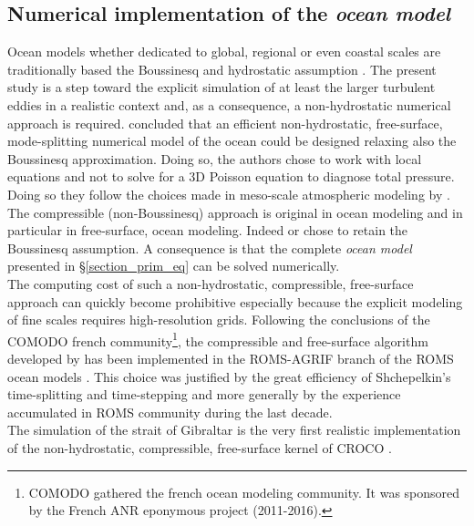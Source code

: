 \subsection{Numerical implementation of the \textit{ocean model}}
Ocean models whether dedicated to global, regional or even coastal scales are traditionally based the Boussinesq and hydrostatic assumption \citep{griffies_elements_2012,shchepetkin_regional_2005}. The present study is a step toward the explicit simulation of at least the larger turbulent eddies in a realistic context and, as a consequence, a non-hydrostatic numerical approach is required. \cite{auclair_non-hydrostatic_2018} concluded that an efficient non-hydrostatic, free-surface, mode-splitting numerical model of the ocean could be designed relaxing also the Boussinesq approximation. Doing so, the authors chose to work with local equations and not to solve for a 3D Poisson equation to diagnose total pressure. Doing so they follow the choices made in meso-scale atmospheric modeling by \cite{skamarock_prototypes_2001}. The compressible (non-Boussinesq) approach is original in ocean modeling and in particular in free-surface, ocean modeling. Indeed \cite{marshall_finite-volume_1997} or \cite{auclair_non-hydrostatic_2011} chose to retain the Boussinesq assumption. A consequence is that the complete \textit{ocean model} presented in \S\ref{section_prim_eq} can be solved numerically.\\
The computing cost of such a non-hydrostatic, compressible, free-surface approach can quickly become prohibitive especially because the explicit modeling of fine scales requires high-resolution grids. Following the conclusions of the COMODO french community\footnote{COMODO gathered the french ocean modeling community. It was sponsored by the French ANR eponymous project (2011-2016).}, the compressible and free-surface algorithm developed by \cite{auclair_non-hydrostatic_2018} has been implemented in the ROMS-AGRIF branch of the ROMS ocean models \citep{shchepetkin_regional_2005}. This choice was justified by the great efficiency of Shchepelkin's time-splitting and time-stepping and more generally by the experience accumulated in ROMS community during the last decade.\\
The simulation of the strait of Gibraltar is the very first realistic implementation of the non-hydrostatic, compressible, free-surface kernel of CROCO \citep{hilt_numerical_2020}.
\color{black}
